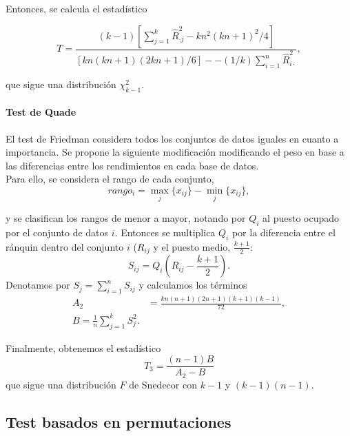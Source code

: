 	Entonces, se calcula el estadístico 

	\[
		T = \frac{(k-1)
				\left[
					\sum\limits_{j=1}^k
						\hat{R}_{\cdot j}^2 -
					kn^2(kn+1)^2/4
				\right]}
				{[kn(kn+1)(2kn+1)/6] -
				 - (1/k) \sum\limits_{i=1}^n 
				 			\hat{R}_{i \cdot}^2},
	\]
	
	que sigue una distribución $\chi^2_{k-1}$.
	
\paragraph{Test de Quade}

	El test de Friedman considera todos los conjuntos de 
datos iguales en cuanto a importancia. Se propone la 
siguiente modificación modificando el peso en base a las
diferencias entre los rendimientos en cada base de datos.\\
	Para ello, se considera el rango de cada conjunto,
	\[ rango_i = \underset{j}{\max} \{x_{ij}\} - 
				 \underset{j}{\min} \{x_{ij}\},
	\]
	
	y se clasifican los rangos de menor a mayor, notando por 
$Q_i$ al puesto ocupado por el conjunto de datos $i$.
Entonces se multiplica $Q_i$ por la diferencia entre el 
ránquin dentro del conjunto $i$ ($R_{ij}$ y el puesto medio,
$\frac{k+1}{2}$:
	\[ 
		S_{ij} = Q_i 
				\left( R_{ij} - \frac{k+1}{2} \right).
	\]
	Denotamos por $S_j = \sum\limits_{i=1}^n S_{ij}$ y
calculamos los términos
\begin{align*}
		A_2 &= \frac{kn(n+1)(2n+1)(k+1)(k-1)}{72},\\
		B = \frac{1}{n} \sum\limits_{j=1}^k S_j^2.
\end{align*}

	Finalmente, obtenemos el estadístico
	\[
		T_3 = \frac{(n-1)B}{A_2 - B}
	\]
	que sigue una distribución $F$ de Snedecor con $k-1$ y
$(k-1)(n-1)$.
	

	

\subsection{Test basados en permutaciones}
	
